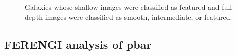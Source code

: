 \documentclass[twocolumn]{aastex6}
\begin{document}
\begin{figure}
\centering





\caption{Galaxies whose shallow images were classified as featured and full depth images were classified as smooth, intermediate, or featured.}
\label{fig:shallow_featured}
\end{figure}

\subsection{FERENGI analysis of pbar}
\label{sec:ferengi_bar}
\end{document}
